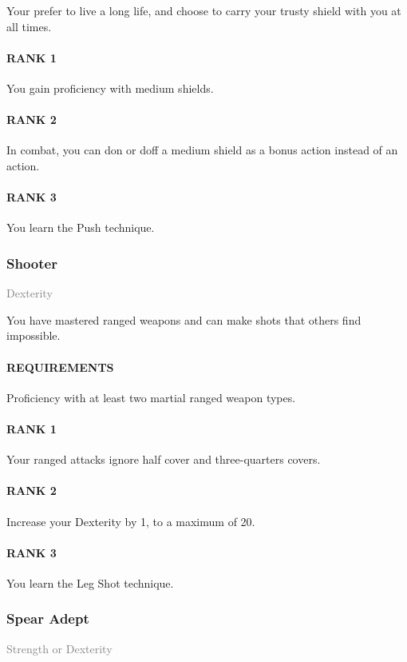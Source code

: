 \normalsize
Your prefer to live a long life, and choose to carry your trusty shield with you at all times.
\paragraph{RANK 1} You gain proficiency with medium shields.
\paragraph{RANK 2} In combat, you can don or doff a medium shield as a bonus action instead of an action.
\paragraph{RANK 3} You learn the Push technique.

\subsubsection{Shooter} \label{feat::shooter}
\small{\textcolor{gray}{Dexterity}}

\normalsize
You have mastered ranged weapons and can make shots that others find impossible.
\paragraph{REQUIREMENTS} Proficiency with at least two martial ranged weapon types.
\paragraph{RANK 1} Your ranged attacks ignore half cover and three-quarters covers.
\paragraph{RANK 2} Increase your Dexterity by 1, to a maximum of 20.
\paragraph{RANK 3} You learn the Leg Shot technique.

\subsubsection{Spear Adept} \label{feat::spearadept}
\small{\textcolor{gray}{Strength or Dexterity}}

